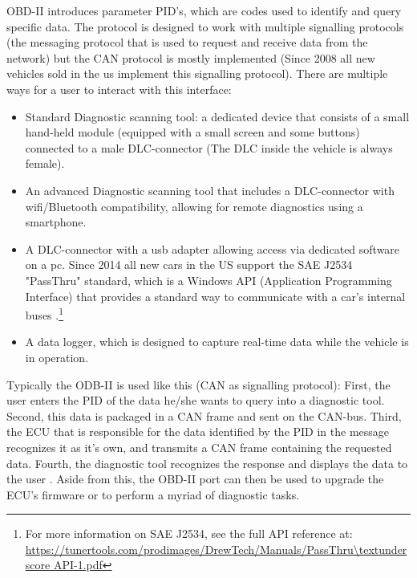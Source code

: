 OBD-II introduces parameter PID's, which are codes used to identify and query specific data. The protocol is designed to work with multiple signalling protocols (the messaging protocol that is used to request and receive data from the network) but the CAN protocol is mostly implemented (Since 2008 all new vehicles sold in the us implement this signalling protocol\cite{OBDconnector}). \newline
\newline
There are multiple ways for a user to interact with this interface:
\begin{itemize}
	\item Standard Diagnostic scanning tool: a dedicated device that consists of a small hand-held module (equipped with a small screen and some buttons) connected to a male DLC-connector (The DLC inside the vehicle is always female).
	
	\item An advanced Diagnostic scanning tool that includes a DLC-connector with wifi/Bluetooth compatibility, allowing for remote diagnostics using a smartphone.
	
	\item A DLC-connector with a usb adapter allowing access via dedicated software on a pc. Since 2014 all new cars in the US support the SAE J2534 "PassThru" standard, which is a Windows API (Application Programming Interface) that provides a standard way to communicate with a car's internal buses \cite{Kosher}.\footnote{For more information on SAE J2534, see the full API reference at: \url{https://tunertools.com/prodimages/DrewTech/Manuals/PassThru\textunderscore API-1.pdf}}
	
	\item A data logger, which is designed to capture real-time data while the vehicle is in operation.
\end{itemize}

Typically the ODB-II is used like this (CAN as signalling protocol): First, the user enters the PID of the data he/she wants to query into a diagnostic tool. Second, this data is packaged in a CAN frame and sent on the CAN-bus. Third, the ECU that is responsible for the data identified by the PID in the message recognizes it as it's own, and transmits a CAN frame containing the requested data. Fourth, the diagnostic tool recognizes the response and displays the data to the user \cite{wiki:PID}. Aside from this, the OBD-II port can then be used to upgrade the ECU's firmware or to perform a myriad of diagnostic tasks.

